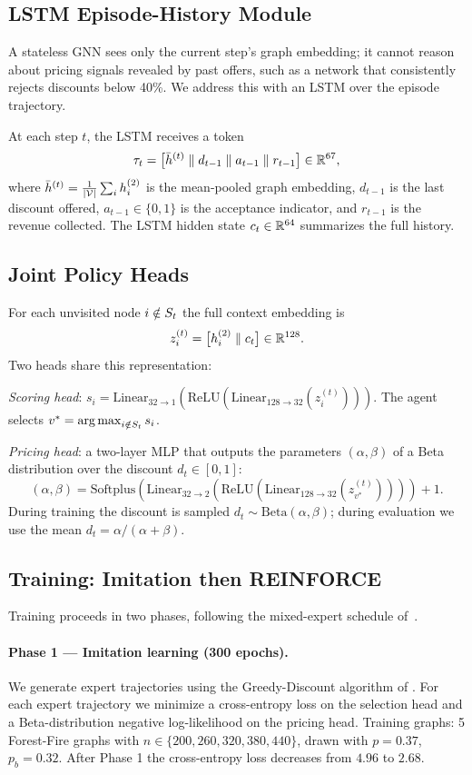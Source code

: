 \subsection{LSTM Episode-History Module}
\label{sec:lstm}

A stateless GNN sees only the current step's graph embedding; it cannot reason
about pricing signals revealed by past offers, such as a network that
consistently rejects discounts below 40\%.
We address this with an LSTM over the episode trajectory.

At each step $t$, the LSTM receives a token
\[
  \tau_t = \bigl[\bar{h}^{(t)}\;\|\; d_{t-1}\;\|\; a_{t-1}\;\|\; r_{t-1}\bigr]
  \in \mathbb{R}^{67},
\]
where $\bar{h}^{(t)} = \frac{1}{|\mathcal{V}|}\sum_i h_i^{(2)}$ is the mean-pooled
graph embedding, $d_{t-1}$ is the last discount offered, $a_{t-1} \in \{0,1\}$
is the acceptance indicator, and $r_{t-1}$ is the revenue collected.
The LSTM hidden state $c_t \in \mathbb{R}^{64}$ summarizes the full history.

\subsection{Joint Policy Heads}
\label{sec:heads}

For each unvisited node $i \notin S_t$ the full context embedding is
\[
  z_i^{(t)} = \bigl[h_i^{(2)}\;\|\; c_t\bigr] \in \mathbb{R}^{128}.
\]
Two heads share this representation:

\emph{Scoring head}: $s_i = \mathrm{Linear}_{32\to1}(\mathrm{ReLU}(\mathrm{Linear}_{128\to32}(z_i^{(t)})))$.
The agent selects $v^* = \operatorname*{arg\,max}_{i \notin S_t} s_i$.

\emph{Pricing head}: a two-layer MLP that outputs the parameters
$(\alpha, \beta)$ of a Beta distribution over the discount $d_t \in [0,1]$:
\[
  (\alpha, \beta) = \mathrm{Softplus}\!\left(\mathrm{Linear}_{32\to2}(\mathrm{ReLU}(\mathrm{Linear}_{128\to32}(z_{v^*}^{(t)})))\right) + 1.
\]
During training the discount is sampled $d_t \sim \mathrm{Beta}(\alpha,\beta)$;
during evaluation we use the mean $d_t = \alpha/(\alpha+\beta)$.

\subsection{Training: Imitation then REINFORCE}
\label{sec:training}

Training proceeds in two phases, following the mixed-expert
schedule of~\citet{anon_wsdm27}.

\paragraph{Phase 1 — Imitation learning (300 epochs).}
We generate expert trajectories using the Greedy-Discount algorithm of
\citet{babaei2013revenue}.
For each expert trajectory we minimize a cross-entropy loss on the selection
head and a Beta-distribution negative log-likelihood on the pricing head.
Training graphs: 5 Forest-Fire graphs with $n \in \{200, 260, 320, 380, 440\}$,
drawn with $p=0.37$, $p_b=0.32$.
After Phase 1 the cross-entropy loss decreases from $4.96$ to $2.68$.

